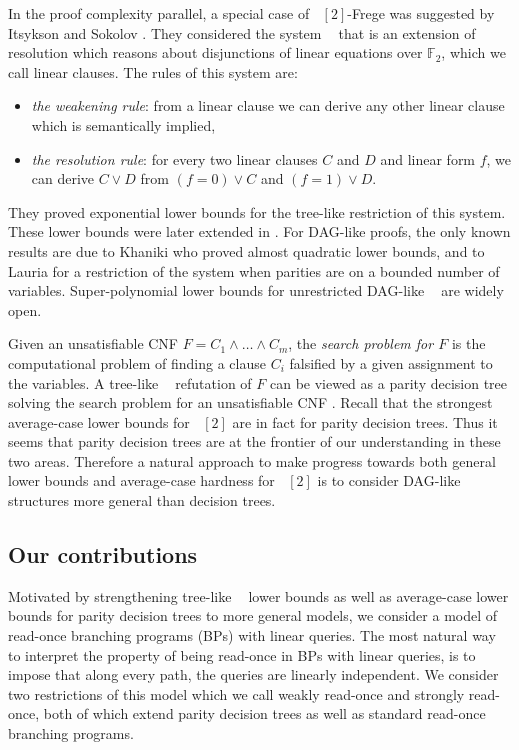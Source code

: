 \documentclass[10pt,a4paper]{article}
\theoremstyle{definition}
\theoremstyle{remark}
\DeclareMathOperator{\ACzero}{\mathsf{AC}^0}
\DeclareMathOperator{\reslin}{\mathsf{Res}[\oplus]}
\newcommand{\bbF}{\mathbb{F}}
\newcommand{\sreadonce}{strongly read-once}
\newcommand{\wreadonce}{weakly read-once}
\begin{document}
In the proof complexity parallel, a special case of $\ACzero[2]$-Frege was suggested by Itsykson and Sokolov \cite{DBLP:journals/apal/ItsyksonS20}. They considered the system $\reslin$ that is an extension of resolution which reasons about disjunctions of linear equations over $\bbF_2$, which we call linear clauses. The rules of this system are:
\begin{itemize}
    \item \emph{the weakening rule}: from a linear clause we can derive any other linear clause which is semantically implied,
    \item \emph{the resolution rule}: for every two linear clauses $C$ and $D$ and linear form $f$, we can derive $C \vee D$ from $(f = 0) \vee C$ and $(f= 1) \vee D$.
\end{itemize}
They proved exponential lower bounds for the tree-like restriction of this system. These lower bounds were later extended in \cite{DBLP:conf/csr/Gryaznov19,DBLP:journals/cc/PartT21}. For DAG-like proofs, the only known results are due to Khaniki \cite{DBLP:journals/eccc/Khaniki20} who proved almost quadratic lower bounds, and to Lauria \cite{DBLP:journals/ipl/Lauria18a} for a restriction of the system when parities are on a bounded number of variables. Super-polynomial lower bounds for unrestricted DAG-like $\reslin$ are widely open.

\bigskip
\noindent{\bf Parity decision trees and tree-like $\reslin$.} Given an unsatisfiable CNF $F = C_1 \wedge \ldots \wedge C_m$, the \emph{search problem for $F$} is the computational problem of finding a clause $C_i$ falsified by a given assignment to the variables. A tree-like $\reslin$ refutation of $F$ can be viewed as a parity decision tree solving the search problem for an unsatisfiable CNF \cite{DBLP:conf/csr/Gryaznov19}. Recall that the strongest average-case lower bounds for $\ACzero[2]$ are in fact for parity decision trees. Thus it seems that parity decision trees are at the frontier of our understanding in these two areas. Therefore a natural approach to make progress towards both general $\reslin$ lower bounds and average-case hardness for $\ACzero[2]$ is to consider DAG-like structures more general than decision trees.

\subsection{Our contributions}

Motivated by strengthening tree-like $\reslin$ lower bounds as well as average-case lower bounds for parity decision trees to more general models, we consider a model of read-once branching programs (BPs) with linear queries. The most natural way to interpret the property of being read-once in BPs with linear queries, is to impose that along every path, the queries are linearly independent. We consider two restrictions of this model which we call \wreadonce{} and \sreadonce{}, both of which extend parity decision trees as well as standard read-once branching programs.
\end{document}

